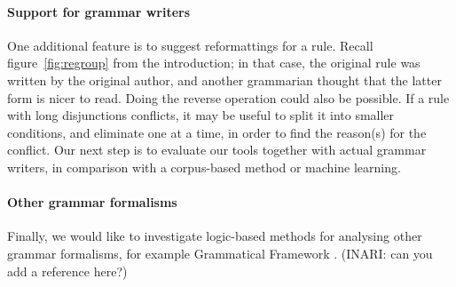 \paragraph{Support for grammar writers}
One additional feature is to suggest reformattings for a rule. Recall
figure~\ref{fig:regroup} from the introduction; in that case, the
original rule was written by the original author, and another
grammarian thought that the latter form is nicer to read. Doing the
reverse operation could also be possible. If a rule with long
disjunctions conflicts, it may be useful to split it into smaller
conditions, and eliminate one at a time, in order to find the
reason(s) for the conflict.
Our next step is to evaluate our tools together with actual grammar writers,
in comparison with a corpus-based method or machine learning.

\paragraph{Other grammar formalisms}
Finally, we would like to investigate logic-based methods for analysing other grammar
formalisms, for example Grammatical Framework \cite{gf}. (INARI: can you add a reference here?)




